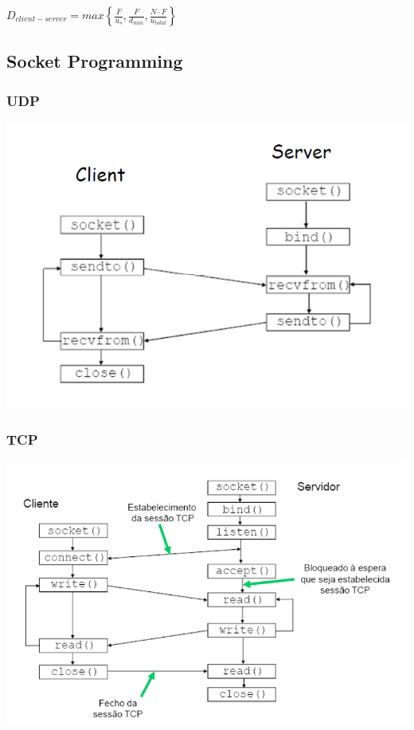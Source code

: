 \documentclass[12pt]{article}
\begin{document}
\begin{center}
    $\displaystyle D_{client-server}=
    max\left\{\frac{F}{u_s},\frac{F}{d_{min}},\frac{N\cdot F}{u_{total}}\right\}$
\end{center}

\subsection{Socket Programming}

\subsubsection*{UDP}

\includegraphics[scale=0.7]{UDP}

\subsubsection*{TCP}

\includegraphics[width=\textwidth]{TCP}
\end{document}
